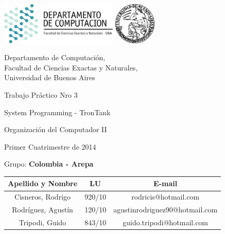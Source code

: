\documentclass[a4paper,10pt,twoside]{article}
\begin{document}


\thispagestyle{caratula}

\begin{center}

\includegraphics[height=2cm]{DC.png} 
\hfill
\includegraphics[height=2cm]{UBA.jpg} 

\vspace{2cm}

Departamento de Computación,\\
Facultad de Ciencias Exactas y Naturales,\\
Universidad de Buenos Aires

\vspace{4cm}

\begin{Huge}
Trabajo Pr\'actico Nro 3\\
\end{Huge}
\begin{Huge}
System Programming - TronTank
\end{Huge}

\vspace{0.5cm}

\begin{Large}
Organización del Computador II
\end{Large}

\vspace{1cm}

Primer Cuatrimestre de 2014

\vspace{4cm}

Grupo: \textbf{Colombia - Arepa}

\vspace{0.5cm}

\begin{tabular}{|c|c|c|}
\hline
Apellido y Nombre & LU & E-mail\\
\hline
Cisneros, Rodrigo 			& 920/10 & rodricis@hotmail.com\\
Rodr\'iguez, Agust\'in	& 120/10 & agustinrodriguez90@hotmail.com\\
Tripodi, Guido		& 843/10 & guido.tripodi@hotmail.com\\
\hline
\end{tabular}

\end{center}
\end{document}
